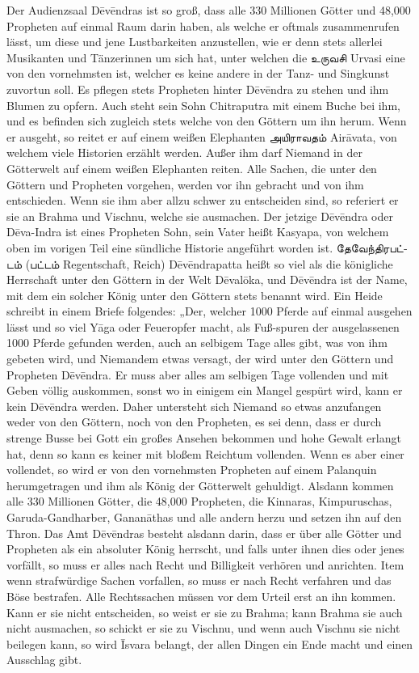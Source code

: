 \documentclass{article}
\newcommand{\TamilText}[1]{\texttamil{#1}}
\newcommand{\tam}[1]{\TamilText{#1}}
\begin{document}
Der Audienzsaal D\={e}v\={e}ndras ist so groß, dass alle 330 Millionen Götter und 48,000 Propheten auf einmal Raum darin haben, als welche er oftmals zusammenrufen lässt, um diese und jene Lustbarkeiten anzustellen, wie er denn stets allerlei Musikanten und Tänzerinnen um sich hat, unter welchen die \tam{உருவசி} Urvasi eine von den vornehmsten ist, welcher es keine andere in der Tanz- und Singkunst zuvortun soll. Es pflegen stets Propheten hinter D\={e}v\={e}ndra zu stehen und ihm Blumen zu opfern. Auch steht sein Sohn Chitraputra mit einem Buche bei ihm, und es befinden sich zugleich stets welche von den Göttern um ihn herum. Wenn er ausgeht, so reitet er auf einem weißen Elephanten \tam{அயிராவதம்} Air\={a}vata, von welchem viele Historien erzählt werden. Außer ihm darf Niemand in der Götterwelt auf einem weißen Elephanten reiten. Alle Sachen, die unter den Göttern und Propheten vorgehen, werden vor ihn gebracht und von ihm entschieden. Wenn sie ihm aber allzu schwer zu entscheiden sind, so referiert er sie an Brahma und Vischnu, welche sie ausmachen. Der jetzige D\={e}v\={e}ndra oder D\={e}va-Indra ist eines Propheten Sohn, sein Vater heißt Kasyapa, von welchem oben im vorigen Teil eine sündliche Historie angeführt worden ist. \tam{தேவேந்திரபட்டம்} (\tam{பட்டம்} Regentschaft, Reich) D\={e}v\={e}ndrapatta heißt so viel als die königliche Herrschaft unter den Göttern in der Welt D\={e}val\={o}ka, und D\={e}v\={e}ndra ist der Name, mit dem ein solcher König unter den Göttern stets benannt wird. Ein Heide schreibt in einem Briefe folgendes: „Der, welcher 1000 Pferde auf einmal ausgehen lässt und so viel Y\={a}ga oder Feueropfer macht, als Fuß-spuren der ausgelassenen 1000 Pferde gefunden werden, auch an selbigem Tage alles gibt, was von ihm gebeten wird, und Niemandem etwas versagt, der wird unter den Göttern und Propheten D\={e}v\={e}ndra. Er muss aber alles am selbigen Tage vollenden und mit Geben völlig auskommen, sonst wo in einigem ein Mangel gespürt wird, kann er kein D\={e}v\={e}ndra werden. Daher untersteht sich Niemand so etwas anzufangen weder von den Göttern, noch von den Propheten, es sei denn, dass er durch strenge Busse bei Gott ein großes Ansehen bekommen und hohe Gewalt erlangt hat, denn so kann es keiner mit bloßem Reichtum vollenden. Wenn es aber einer vollendet, so wird er von den vornehmsten Propheten auf einem Palanquin herumgetragen und ihm als König der Götterwelt gehuldigt. Alsdann kommen alle 330 Millionen Götter, die 48,000 Propheten, die Kinnaras, Kimpuruschas, Garuda-Gandharber, Ganan\={a}thas und alle andern herzu und setzen ihn auf den Thron. Das Amt D\={e}v\={e}ndras besteht alsdann darin, dass er über alle Götter und Propheten als ein absoluter König herrscht, und falls unter ihnen dies oder jenes vorfällt, so muss er alles nach Recht und Billigkeit verhören und anrichten. Item wenn strafwürdige Sachen vorfallen, so muss er nach Recht verfahren und das Böse bestrafen. Alle Rechtssachen müssen vor dem Urteil erst an ihn kommen. Kann er sie nicht entscheiden, so weist er sie zu Brahma; kann Brahma sie auch nicht ausmachen, so schickt er sie zu Vischnu, und wenn auch Vischnu sie nicht beilegen kann, so wird \={I}svara belangt, der allen Dingen ein Ende macht und einen Ausschlag gibt.
\end{document}
